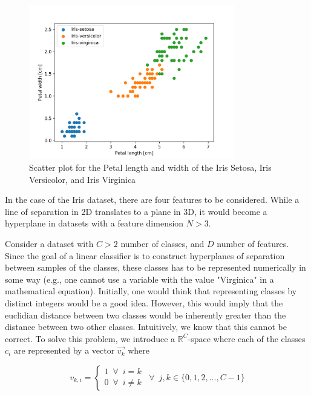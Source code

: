 \documentclass{article}
\begin{document}
\begin{figure}
    \centering
    \includegraphics[width=0.8\textwidth]{../images/petal_scatter.png}
    \caption{Scatter plot for the Petal length and width of the Iris Setosa, Iris Versicolor,
    and Iris Virginica}
    \label{fig:petal_scatter_plot}
\end{figure}

In the case of the Iris dataset, there are four features to be considered. While a line of separation
in 2D translates to a plane in 3D, it would become a hyperplane in datasets with a feature dimension
$N > 3$.

Consider a dataset with $C > 2$ number of classes, and $D$ number of features. Since the goal of
a linear classifier is to construct hyperplanes of separation between samples of the classes,
these classes has to be represented numerically in some way (e.g., one cannot use a variable
with the value "Virginica" in a mathematical equation). Initially, one would think that
representing classes by distinct integers would be a good idea. However, this would imply
that the euclidian distance between two classes would be inherently greater than the distance
between two other classes. Intuitively, we know that this cannot be correct. To solve this problem,
we introduce a $\mathbb{R}^C$-space where each of the classes $c_i$ are represented by a vector $\vec{v_k}$ where

\begin{equation}
    v_{k,i} = \begin{cases}
        1 \enspace \forall \enspace i = k \\
        0 \enspace \forall \enspace i \neq k
    \end{cases} \enspace \forall \enspace j,k \in \{0, 1, 2, ..., C - 1\}\label{eq:class_vector}
\end{equation}
\end{document}
